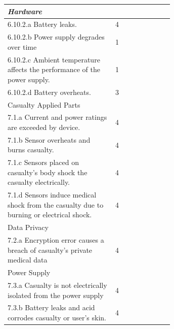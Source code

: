 \documentclass{article}
\begin{document}
\begin{longtable}{|p{0.65\linewidth}|l|}
\hline
\textit{Hardware}                                                  &                     \\
\hline
6.10.2.a Battery leaks.                                          & 4                   \\
\hline
6.10.2.b Power supply degrades over time                         & 1                   \\
\hline
6.10.2.c Ambient temperature affects the performance of the power supply.                                                                                          & 1                   \\
\hline
6.10.2.d Battery overheats.                                      & 3                   \\
\hline
\rowcolor{Gray}
Casualty Applied Parts                                            &                     \\
\hline
7.1.a Current and power ratings are exceeded by device.                                                                                                            & 4                   \\
\hline
7.1.b Sensor overheats and burns casualty.                       & 4                   \\
\hline
7.1.c Sensors placed on casualty’s body shock the casualty electrically.                                                                                           & 4                   \\
\hline
7.1.d Sensors induce medical shock from the casualty due to burning or electrical shock.                                                                           & 4                   \\
\hline
\rowcolor{Gray}
Data Privacy                                                       &                     \\
\hline
7.2.a Encryption error causes a breach of casualty’s private medical data                                                                                          & 4                   \\
\hline
\rowcolor{Gray}
Power Supply                                                       &                     \\
\hline
7.3.a Casualty is not electrically isolated from the power supply                                                                                                  & 4                   \\
\hline
7.3.b Battery leaks and acid corrodes casualty or user’s skin.                                                                                                     & 4                   \\

\end{longtable}
\end{document}
